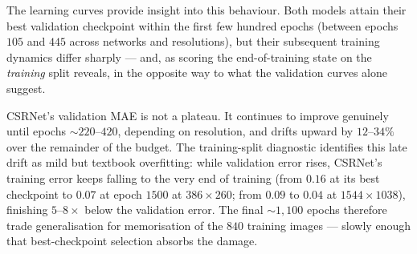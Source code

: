
The learning curves provide insight into this behaviour. Both models
attain their best validation checkpoint within the first few hundred
epochs (between epochs $105$ and $445$ across networks and
resolutions), but their subsequent training dynamics differ sharply —
and, as scoring the end-of-training state on the \emph{training} split
reveals, in the opposite way to what the validation curves alone
suggest.

CSRNet's validation MAE is not a plateau. It continues to improve
genuinely until epochs ${\sim}220$--$420$, depending on resolution,
and drifts upward by $12$--$34\%$ over the remainder of the budget.
The training-split diagnostic identifies this late drift as mild but
textbook overfitting: while validation error rises, CSRNet's training
error keeps falling to the very end of training (from $0.16$ at its
best checkpoint to $0.07$ at epoch $1500$ at $386\times260$; from
$0.09$ to $0.04$ at $1544\times1038$), finishing $5$--$8\times$ below
the validation error. The final ${\sim}1{,}100$ epochs therefore trade
generalisation for memorisation of the $840$ training images — slowly
enough that best-checkpoint selection absorbs the damage.

